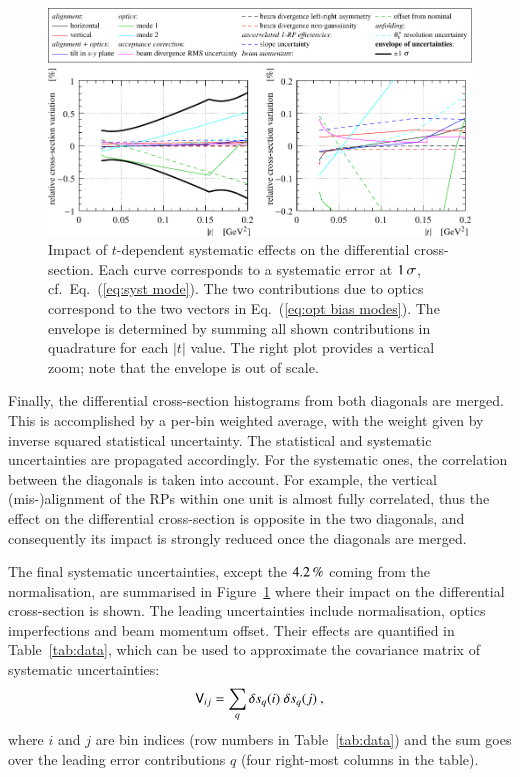 \begin{figure}
\begin{center}
\includegraphics{fig/direct_method_mode_cmp_presentation.pdf}
\vskip-3mm
\caption{%
Impact of $t$-dependent systematic effects on the differential cross-section. Each curve corresponds to a systematic error at $1\,{\rm \sigma}$, cf.~Eq.~(\ref{eq:syst mode}).
The two contributions due to optics correspond to the two vectors in Eq.~(\ref{eq:opt bias modes}).
The envelope is determined by summing all shown contributions in quadrature for each $|t|$ value.
The right plot provides a vertical zoom; note that the envelope is out of scale.
}
\label{fig:syst unc}
\end{center}
\end{figure}

Finally, the differential cross-section histograms from both diagonals are merged. This is accomplished by a per-bin weighted average, with the weight given by inverse squared statistical uncertainty. The statistical and systematic uncertainties are propagated accordingly. For the systematic ones, the correlation between the diagonals is taken into account. For example, the vertical (mis-)alignment of the RPs within one unit is almost fully correlated, thus the effect on the differential cross-section is opposite in the two diagonals, and consequently its impact is strongly reduced once the diagonals are merged.

The final systematic uncertainties, except the $4.2\,{\rm \%}$ coming from the normalisation, are summarised in Figure~\ref{fig:syst unc} where their impact on the differential cross-section is shown. The leading uncertainties include normalisation, optics imperfections and beam momentum offset. Their effects are quantified in Table~\ref{tab:data}, which can be used to approximate the covariance matrix of systematic uncertainties:
\begin{equation}
\label{eq:covar mat}
\mathsf{V}_{ij} = \sum_{q} \delta s_{q}(i)\ \delta s_{q}(j)\: ,
\end{equation}
where $i$ and $j$ are bin indices (row numbers in Table~\ref{tab:data}) and the sum goes over the leading error contributions $q$ (four right-most columns in the table).


